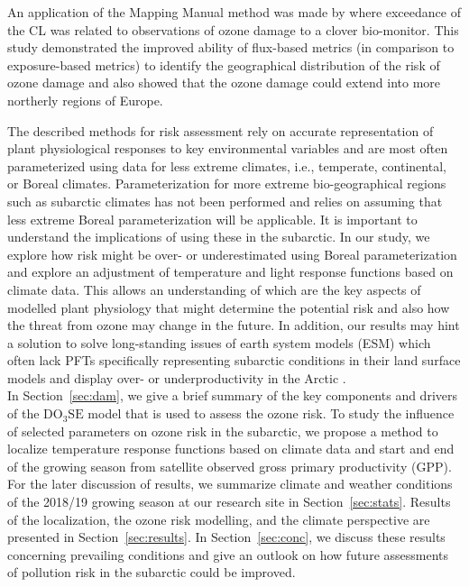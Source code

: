 \documentclass[bg, manuscript]{copernicus}
\begin{document}
An application of the Mapping Manual method was made by \citet{GCB:Mills2011} where exceedance of the CL was related to observations of ozone damage to a clover bio-monitor. This study demonstrated the improved ability of flux-based metrics (in comparison to exposure-based metrics) to identify the geographical distribution of the risk of ozone damage and also showed that the ozone damage could extend into more northerly regions of Europe.

The described methods for risk assessment rely on accurate representation of plant physiological responses to key environmental variables and are most often parameterized using data for less extreme climates, i.e., temperate, continental, or Boreal climates. Parameterization for more extreme bio-geographical regions such as subarctic climates has not been performed and relies on assuming that less extreme Boreal parameterization will be applicable. It is important to understand the implications of using these in the subarctic. In our study, we explore how risk might be over- or underestimated using Boreal parameterization and explore an adjustment of temperature and light response functions based on climate data. This allows an understanding of which are the key aspects of modelled plant physiology that might determine the potential risk and also how the threat from ozone may change in the future. In addition, our results may hint a solution to solve long-standing issues of earth system models (ESM) which often lack PFTs specifically representing subarctic conditions in their land surface models and display over- or underproductivity in the Arctic \citep{GMD:Poulter2015,JAMES:Lawrence2019}.\\ 

In Section~\ref{sec:dam}, we give a brief summary of the key components and  drivers of the $\mathrm{DO_3SE}$ model that is used to assess the ozone risk. To study the influence of selected parameters on ozone risk in the subarctic, we propose a method to localize temperature response functions based on climate data and start and end of the growing season from satellite observed gross primary productivity (GPP). For the later discussion of results, we summarize climate and weather conditions of the 2018/19 growing season at our research site in Section~\ref{sec:stats}. Results of the localization, the ozone risk modelling, and the climate perspective are presented in Section~\ref{sec:results}. In Section~\ref{sec:conc}, we discuss these results concerning prevailing conditions and give an outlook on how future assessments of pollution risk in the subarctic could be improved.
\end{document}
